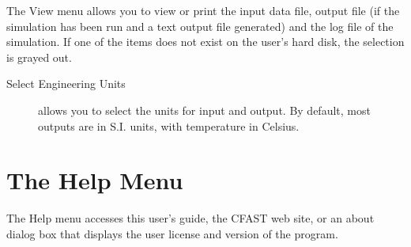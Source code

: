 The View menu allows you to view or print the input data file, output file (if the simulation has been run and a text output file generated) and the log file of the simulation. If one of the items does not exist on the user's hard disk, the selection is grayed out.
\begin{description}
\item[Select Engineering Units] allows you to select the units for input and output. By default, most outputs are in S.I. units, with temperature in Celsius.
\end{description}


\section{The Help Menu}

The Help menu accesses this user's guide, the CFAST web site, or an about dialog box that displays the user license and version of the program.





